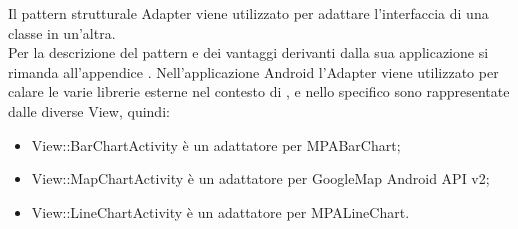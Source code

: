 	Il pattern strutturale Adapter viene utilizzato per adattare l'interfaccia di una classe in un'altra.\\
	Per la descrizione del pattern e dei vantaggi derivanti dalla sua applicazione si rimanda all'appendice .
	Nell'applicazione Android l'Adapter viene utilizzato per calare le varie librerie esterne nel contesto di \projectname{}, e nello specifico sono rappresentate dalle diverse View, quindi:
	\begin{itemize}
	\item View::BarChartActivity è un adattatore per MPABarChart;
	\item View::MapChartActivity è un adattatore per GoogleMap Android API v2;
	\item View::LineChartActivity è un adattatore per MPALineChart.
	\end{itemize}
